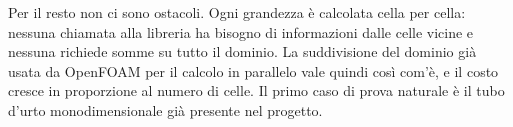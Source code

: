 Per il resto non ci sono ostacoli. Ogni grandezza è calcolata cella per cella:
nessuna chiamata alla libreria ha bisogno di informazioni dalle celle vicine e
nessuna richiede somme su tutto il dominio. La suddivisione del dominio già
usata da OpenFOAM per il calcolo in parallelo vale quindi così com'è, e il
costo cresce in proporzione al numero di celle. Il primo caso di prova
naturale è il tubo d'urto monodimensionale già presente nel progetto.
